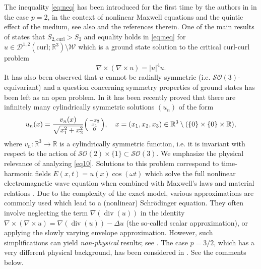 \documentclass[12pt,leqno,twoside]{amsart}
\def\div{\mathop{\mathrm{div}}}
\def\R{\mathbb{R}}
\def\curl{\mathrm{curl}}
\def\W{\mathcal{W}}
\newcommand{\SO}{\cS\cO}
\newcommand{\cD}{{\mathcal D}}
\newcommand{\cO}{{\mathcal O}}
\newcommand{\cS}{{\mathcal S}}
\def\curlop{\nabla\times}
\numberwithin{equation}{section}
\begin{document}
The inequality \eqref{eq:neq} has been introduced for the first time by  the authors in \cite{MedSz} in the case $p=2$, in the context of nonlinear Maxwell equations and the quintic effect of the medium, see also \cite{Mederski,MederskiJFA2018} and the references therein. One of the main results of \cite{MedSz} states that $S_{2,\curl}>S_2$ and equality holds in \eqref{eq:neq} for $u\in  \cD^{1,2}(\curl;\R^3)\setminus \W$ which is a ground state solution to the critical curl-curl problem 
\begin{equation} \label{eq10}
\curlop (\curlop u)= |u|^{4}u.
\end{equation}
It has also been observed that $u$ cannot be radially symmetric (i.e. $\SO(3)$-equivariant) and a question concerning symmetry properties of ground states has been left as an open problem. In \cite{GaczkowskiMederskiSchino} it has been recently proved that there are infinitely many  cylindrically symmetric solutions $(u_n)$
of the form
\begin{equation*}
u_n(x)=\frac{v_n(x)}{\sqrt{x_1^2+x_2^2}}\Bigl(\begin{smallmatrix}
-x_2\\
x_1\\
0
\end{smallmatrix}\Bigr),\quad x=(x_1,x_2,x_3)\in\R^3\setminus(\{0\}\times\{0\}\times\R),
\end{equation*}
where $v_n:\R^3\to\R$ is a cylindrically symmetric function, i.e. it is invariant with respect to the action of $\SO(2)\times\{1\}\subset \SO(3)$. We emphasize the physical relevance of analyzing \eqref{eq10}. Solutions to this problem correspond to time-harmonic fields 
$E(x,t)=u(x)\cos(\omega t)$ which solve the full nonlinear electromagnetic wave equation when combined with Maxwell's laws and material relations \cite{Agrawal,BartschMederski1,Stuart:1993}.
Due to the complexity of the exact model, various approximations are commonly used which lead to a (nonlinear) Schr\"odinger equation. They often involve neglecting the term $\nabla (\div(u))$ in the identity $\curlop (\curlop u)=\nabla (\div(u))-\Delta u$ (the so-called scalar approximation), or applying the slowly varying envelope approximation. However, such simplifications can yield {\em non-physical} results; see \cite{Akhmediev-etal, Ciattoni-etal:2005}. The case $p=3/2$, which has a very different physical background, has been considered in \cite{FrankLoss2}. See the comments below.
\end{document}
